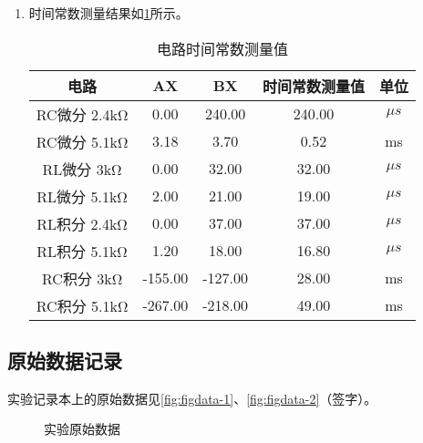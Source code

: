 \documentclass[dvipsnames, svgnames,a4paper,11pt]{article}
\begin{document}
\begin{enumerate}
		RC电路三角波型和RL电路三角波型如图\cref{fig:graph2-5}所示

		\begin{figure}[htbp]
			\centering
			\quad
			\quad
			\caption{RC电路和RL电路三角波}
			\label{fig:graph2-5}
		\end{figure}
		
		\item 时间常数测量结果如\cref{tab:tab1}所示。
		
		\begin{table}[h]
			\centering
			\caption{电路时间常数测量值}
			\label{tab:tab1}
			\begin{tabular}{|c|c|c|c|c|}
				\hline
				电路 & AX & BX & 时间常数测量值 & 单位 \\
				\hline
				RC微分 2.4kΩ & 0.00 & 240.00 & 240.00 & $\mu s$ \\
				RC微分 5.1kΩ & 3.18 & 3.70 & 0.52 & ms \\
				RL微分 3kΩ & 0.00 & 32.00 & 32.00 & $\mu s$ \\
				RL微分 5.1kΩ & 2.00 & 21.00 & 19.00 & $\mu s$ \\
				RL积分 2.4kΩ & 0.00 & 37.00 & 37.00 & $\mu s$ \\
				RL积分 5.1kΩ & 1.20 & 18.00 & 16.80 & $\mu s$ \\
				RC积分 3kΩ & -155.00 & -127.00 & 28.00 & ms \\
				RC积分 5.1kΩ & -267.00 & -218.00 & 49.00 & ms \\
				\hline
			\end{tabular}
		\end{table}					
			
	\end{enumerate}
	
	
	\clearpage
	\subsection{原始数据记录}
	实验记录本上的原始数据见\cref{fig:figdata-1}、\cref{fig:figdata-2}（签字）。

		\begin{figure}[htbp]
			\centering
			\quad
			\quad
			\caption{实验原始数据}
			\label{fig:graph10}
		\end{figure}
	
\end{document}

